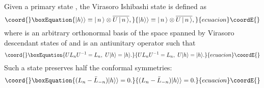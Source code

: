 \documentclass[a4paper,12pt]{article} \textheight=8.5truein
\providecommand{\ket}[1]{\left|\, #1\,\right\rangle}
\providecommand{\ol}{\overline}
\begin{document}
Given a primary state \coordHE{}, the Virasoro Ishibashi state
\coordHE{} is defined as \cite{Ishibashi:1988kg}
\begin{equation}\coord{}\boxEquation{\label{ishibashi}
|h\rangle\rangle\equiv\ket{n}\otimes \ol{U\ket{n}},
}{|h\rangle\rangle\equiv\ket{n}\otimes \ol{U\ket{n}},
}{ecuacion}\coordE{}\end{equation}
where \myHighlight{$\{\ket{n}\}$}\coordHE{} is an arbitrary orthonormal basis of the space
spanned by Virasoro descendant states of \coordHE{} and \coordHE{} is an
antiunitary operator such that
\begin{equation}\coord{}\boxEquation{\label{U 1}
U L_n U^{-1}=L_n,\ U |h\rangle=|h\rangle.
}{U L_n U^{-1}=L_n,\ U |h\rangle=|h\rangle.
}{ecuacion}\coordE{}\end{equation}
Such a state preserves half the conformal symmetries:
\begin{equation}\coord{}\boxEquation{    (L_n-\bar{L}_{-n})|h\rangle\rangle=0.
}{    (L_n-\bar{L}_{-n})|h\rangle\rangle=0.
}{ecuacion}\coordE{}\end{equation}
\end{document}
